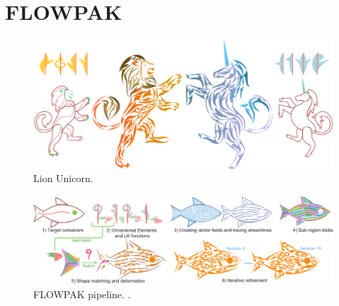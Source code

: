 
\chapter{FLOWPAK}

\begin{figure}
\centering
\includegraphics[width=1.0\textwidth]{figures/flowpak/lion_unicorn.pdf} 
\caption{\label{fig_lion_unicorn} 
Lion Unicorn. }
\end{figure}

\begin{figure}
\centering
\includegraphics[width=1.0\textwidth]{figures/flowpak/pipeline.pdf} 
\caption{\label{fig_flowpak_pipeline} 
FLOWPAK pipeline. .}
\end{figure}